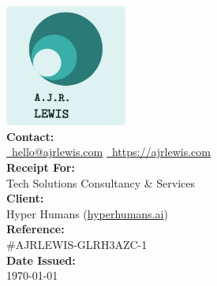 \documentclass{article}
\begin{document}
    \begin{center}
        \includegraphics[width=4cm]{images/logo.png}\\
        \vspace{0.25cm}
        \textbf{Contact:}\\
        \href{mailto:hello@ajrlewis.com}{\Letter~hello@ajrlewis.com}\quad
        \href{https://www.ajrlewis.com}{\Mundus~https://ajrlewis.com} \\
        \vspace{0.75cm}
        \large
        \textbf{Receipt For:}\\
        Tech Solutions Consultancy \& Services\\
        \vspace{0.5cm}
        \textbf{Client:}\\
        Hyper Humans (\href{https://hyperhumans.ai}{hyperhumans.ai})\\
        \vspace{0.5cm}
        \textbf{Reference:}\\
        \#AJRLEWIS-GLRH3AZC-1\\
        \vspace{0.5cm}
        \textbf{Date Issued:}\\
        \today\\
        \vspace{0.25cm}
    \end{center}

    \noindent
    \vspace{0.25cm}
\end{document}
